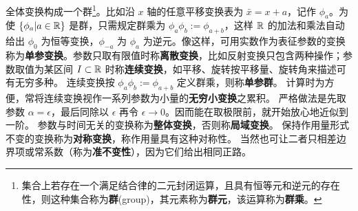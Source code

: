 全体变换构成一个群\footnote{集合上若存在一个满足结合律的二元封闭运算，且具有恒等元和逆元的存在性，则这种集合称为\textbf{群}(group)，其元素称为\textbf{群元}，该运算称为\textbf{群乘}。}。比如沿 $x$ 轴的任意平移变换表为 $\bar x=x+a$，记作 $\phi_a$。为使 $\{\phi_a|a\in\mathbb{R}\}$ 是群，只需规定群乘为 $\phi_a\phi_b:=\phi_{a+b}$，这样 $\mathbb{R}$ 的加法和乘法自动给出 $\phi_0$ 为恒等变换，$\phi_{-a}$ 为 $\phi_{a}$ 为逆元。像这样，可用实数作为表征参数的变换称为\textbf{单参变换}。参数只取有限值时称\textbf{离散变换}，比如反射变换只包含两种操作；参数取值为某区间 $I\subset\mathbb{R}$ 时称\textbf{连续变换}，如平移、旋转按平移量、旋转角来描述可有无穷多种。
连续变换按 $\phi_a\phi_b:=\phi_{a+b}$ 定义群乘，则称\textbf{单参群}。
计算时为方便，常将连续变换视作一系列参数为小量的\textbf{无穷小变换}之累积。
严格做法是先取参数 $\alpha=\epsilon$，最后同除以 $\epsilon$ 再令 $\epsilon\to 0$。因而能在取极限前，就开始放心地近似到一阶。
参数与时间无关的变换称为\textbf{整体变换}，否则称\textbf{局域变换}。
保持作用量形式不变的变换称为\textbf{对称变换}，称作用量具有这种对称性。
当然也可让二者只相差边界项或常系数（称为\textbf{准不变性}），因为它们给出相同正路。

